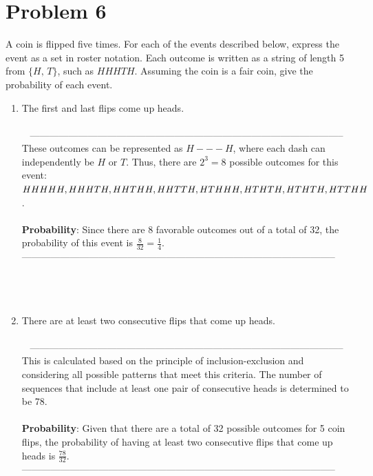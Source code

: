 \documentclass{amsart}
\theoremstyle{definition}
\theoremstyle{Exercise}
\theoremstyle{remark}
\theoremstyle{rule}
\numberwithin{equation}{section}
\begin{document}
\section*{Problem 6}
A coin is flipped five times. For each of the events described below, express the event as a set in roster notation. Each outcome is written as a string of length 5 from $\{H,\, T\}$, such as $HHHTH$. Assuming the coin is a fair coin, give the probability of each event.\\
\begin{enumerate}[label=(\alph*)]
\item The first and last flips come up heads.\\\\\
--------------------------------------------------------------------------------------------------\\
These outcomes can be represented as $H---H$, where each dash can independently be $H$ or $T$. Thus, there are $2^3 = 8$ possible outcomes for this event: $HHHHH, HHHTH, HHTHH, HHTTH, HTHHH, HTHTH,\\ HTHTH, HTTHH$.\\\\
\textbf{Probability}: Since there are 8 favorable outcomes out of a total of 32, the probability of this event is $\frac{8}{32} = \frac{1}{4}$.\\
--------------------------------------------------------------------------------------------------\\
\\\\\
\item There are at least two consecutive flips that come up heads.\\\\\
--------------------------------------------------------------------------------------------------\\
This is calculated based on the principle of inclusion-exclusion and considering all possible patterns that meet this criteria. The number of sequences that include at least one pair of consecutive heads is determined to be 78.\\\\
\textbf{Probability}: Given that there are a total of 32 possible outcomes for 5 coin flips, the probability of having at least two consecutive flips that come up heads is $\frac{78}{32}$.\\
--------------------------------------------------------------------------------------------------\\

\end{enumerate}
\end{document}

